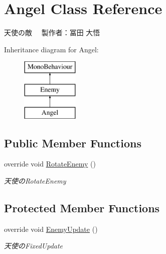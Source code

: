 \hypertarget{class_angel}{}\section{Angel Class Reference}
\label{class_angel}


天使の敵　 製作者：冨田 大悟  


Inheritance diagram for Angel\+:\begin{figure}[H]
\begin{center}
\leavevmode
\includegraphics[height=3.000000cm]{class_angel}
\end{center}
\end{figure}
\subsection*{Public Member Functions}
\begin{DoxyCompactItemize}
\item 
override void \hyperlink{class_angel_ade12610b82079f5748f8d1393cce1f9b}{Rotate\+Enemy} ()
\begin{DoxyCompactList}\small\item\em 天使の\+Rotate\+Enemy \end{DoxyCompactList}\end{DoxyCompactItemize}
\subsection*{Protected Member Functions}
\begin{DoxyCompactItemize}
\item 
override void \hyperlink{class_angel_a2c35f5d2b12e43d64cc686728a6225c2}{Enemy\+Update} ()
\begin{DoxyCompactList}\small\item\em 天使の\+Fixed\+Update \end{DoxyCompactList}\end{DoxyCompactItemize}
